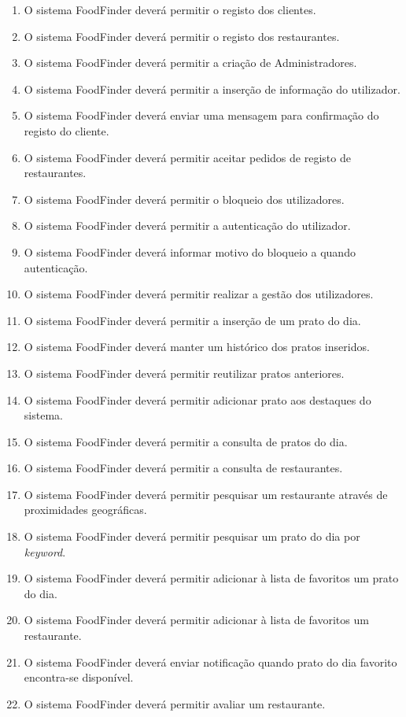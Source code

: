 \documentclass[a4paper,12pt]{report}
\begin{document}
\begin{enumerate}
\item O sistema FoodFinder deverá permitir o registo dos clientes.
\item O sistema FoodFinder deverá permitir o registo dos restaurantes.
\item O sistema FoodFinder deverá permitir a criação de Administradores.
\item O sistema FoodFinder deverá permitir a inserção de informação do utilizador.
\item O sistema FoodFinder deverá enviar uma mensagem para confirmação do registo do cliente.
\item O sistema FoodFinder deverá permitir aceitar pedidos de registo de restaurantes.
\item O sistema FoodFinder deverá permitir o bloqueio dos utilizadores.
\item O sistema FoodFinder deverá permitir a autenticação do utilizador.
\item O sistema FoodFinder deverá informar motivo do bloqueio a quando autenticação.
\item O sistema FoodFinder deverá permitir realizar a gestão dos utilizadores.
\bigskip
\bigskip
\bigskip
\item O sistema FoodFinder deverá permitir a inserção de um prato do dia.
\item O sistema FoodFinder deverá manter um histórico dos pratos inseridos.
\item O sistema FoodFinder deverá permitir reutilizar pratos anteriores.
\item O sistema FoodFinder deverá permitir adicionar prato aos destaques do sistema.
\bigskip
\bigskip
\bigskip
\item O sistema FoodFinder deverá permitir a consulta de pratos do dia.
\item O sistema FoodFinder deverá permitir a consulta de restaurantes.
\item O sistema FoodFinder deverá permitir pesquisar um restaurante através de proximidades geográficas.
\item O sistema FoodFinder deverá permitir pesquisar um prato do dia por \textit{keyword}.
\item O sistema FoodFinder deverá permitir adicionar à lista de favoritos um prato do dia.
\item O sistema FoodFinder deverá permitir adicionar à lista de favoritos um restaurante.
\item O sistema FoodFinder deverá enviar notificação quando prato do dia favorito encontra-se disponível.
\item O sistema FoodFinder deverá permitir avaliar um restaurante.
\end{enumerate}
\end{document}
